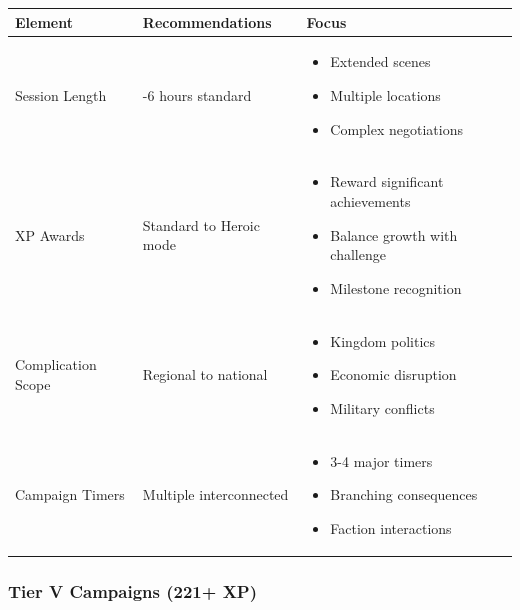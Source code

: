 \documentclass[11pt,letterpaper]{article}
\begin{document}
\begin{longtable}{|>{\raggedright\arraybackslash}p{3cm}|>{\raggedright\arraybackslash}p{4cm}|>{\raggedright\arraybackslash}p{5cm}|}
\hline
\textbf{Element} & \textbf{Recommendations} & \textbf{Focus} \\
\hline
Session Length & 4-6 hours standard & 
\begin{itemize}
    \item Extended scenes
    \item Multiple locations
    \item Complex negotiations
\end{itemize} \\
\hline
XP Awards & Standard to Heroic mode & 
\begin{itemize}
    \item Reward significant achievements
    \item Balance growth with challenge
    \item Milestone recognition
\end{itemize} \\
\hline
Complication Scope & Regional to national & 
\begin{itemize}
    \item Kingdom politics
    \item Economic disruption
    \item Military conflicts
\end{itemize} \\
\hline
Campaign Timers & Multiple interconnected & 
\begin{itemize}
    \item 3-4 major timers
    \item Branching consequences
    \item Faction interactions
\end{itemize} \\
\hline
\end{longtable}

\subsubsection{Tier V Campaigns (221+ XP)}
\end{document}
